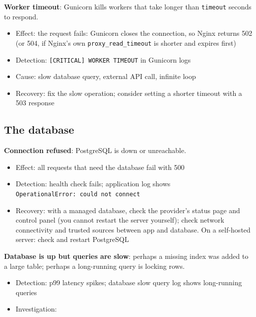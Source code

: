 \noindent{}\textbf{Worker timeout}: Gunicorn kills workers that take longer than \texttt{timeout} seconds to respond.

\begin{itemize}
\tightlist
\item
  Effect: the request fails: Gunicorn closes the connection, so Nginx returns 502 (or 504, if Nginx's own \texttt{proxy\_read\_timeout} is shorter and expires first)
\item
  Detection: \texttt{{[}CRITICAL{]}\ WORKER\ TIMEOUT} in Gunicorn logs
\item
  Cause: slow database query, external API call, infinite loop
\item
  Recovery: fix the slow operation; consider setting a shorter timeout with a 503 response
\end{itemize}

\subsection*{The database}\label{37-reliability:the-database}

\textbf{Connection refused}: PostgreSQL is down or unreachable.

\begin{itemize}
\tightlist
\item
  Effect: all requests that need the database fail with 500
\item
  Detection: health check fails; application log shows \texttt{OperationalError:}\allowbreak{}\texttt{\ could\ not\ connect}
\item
  Recovery: with a managed database, check the provider's status page and control panel (you cannot restart the server yourself); check network connectivity and trusted sources between app and database. On a self-hosted server: check and restart PostgreSQL
\end{itemize}

\noindent{}\textbf{Database is up but queries are slow}: perhaps a missing index was added to a large table; perhaps a long-running query is locking rows.

\begin{itemize}
\tightlist
\item
  Detection: p99 latency spikes; database slow query log shows long-running queries
\item
  Investigation:
\end{itemize}

